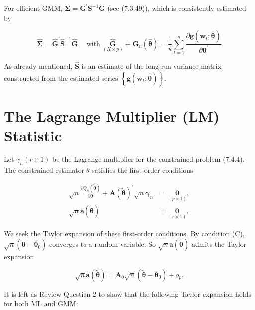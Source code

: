 \documentclass[10pt]{article}
\begin{document}
For efficient GMM, $\boldsymbol{\Sigma}=\mathbf{G}^{\prime} \mathbf{S}^{-1} \mathbf{G}$ (see (7.3.49)), which is consistently estimated by


\begin{equation*}
\widehat{\mathbf{\Sigma}}=\widehat{\mathbf{G}}^{\prime} \widehat{\mathbf{S}}^{-1} \widehat{\mathbf{G}} \quad \text { with } \underset{(K \times p)}{\widehat{\mathbf{G}}} \equiv \mathbf{G}_{n}(\hat{\boldsymbol{\theta}})=\frac{1}{n} \sum_{t=1}^{n} \frac{\partial \mathbf{g}\left(\mathbf{w}_{t} ; \hat{\boldsymbol{\theta}}\right)}{\partial \boldsymbol{\theta}^{\prime}} \tag{7.4.14}
\end{equation*}


As already mentioned, $\widehat{\mathbf{S}}$ is an estimate of the long-run variance matrix constructed from the estimated series $\left\{\mathbf{g}\left(\mathbf{w}_{t} ; \hat{\boldsymbol{\theta}}\right)\right\}$.

\section*{The Lagrange Multiplier (LM) Statistic}
Let $\gamma_{n}(r \times 1)$ be the Lagrange multiplier for the constrained problem (7.4.4). The constrained estimator $\tilde{\theta}$ satisfies the first-order conditions


\begin{align*}
\sqrt{n} \frac{\partial Q_{n}(\tilde{\boldsymbol{\theta}})}{\partial \boldsymbol{\theta}}+\mathbf{A}(\tilde{\boldsymbol{\theta}})^{\prime} \sqrt{n} \boldsymbol{\gamma}_{n} & =\underset{(p \times 1)}{\mathbf{0}},  \tag{7.4.15}\\
\sqrt{n} \mathbf{a}(\tilde{\boldsymbol{\theta}}) & =\underset{(r \times 1)}{\mathbf{0}} . \tag{7.4.16}
\end{align*}


We seek the Taylor expansion of these first-order conditions. By condition (C), $\sqrt{n}\left(\tilde{\boldsymbol{\theta}}-\boldsymbol{\theta}_{0}\right)$ converges to a random variable. So $\sqrt{n} \mathbf{a}(\tilde{\boldsymbol{\theta}})$ admits the Taylor expansion


\begin{equation*}
\sqrt{n} \mathbf{a}(\tilde{\boldsymbol{\theta}})=\mathbf{A}_{0} \sqrt{n}\left(\tilde{\boldsymbol{\theta}}-\boldsymbol{\theta}_{0}\right)+o_{p} . \tag{7.4.17}
\end{equation*}


It is left as Review Question 2 to show that the following Taylor expansion holds for both ML and GMM:
\end{document}

